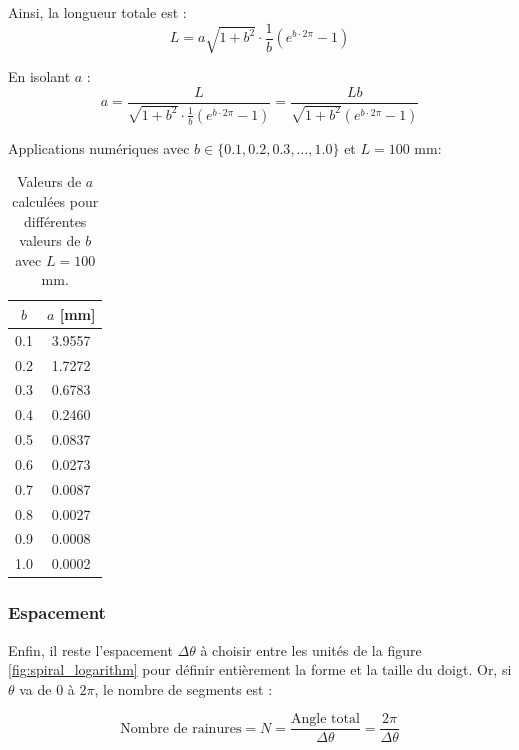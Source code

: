\documentclass[a4paper, 11pt]{report}
\begin{document}
            Ainsi, la longueur totale est :
            \[
            L = a \sqrt{1 + b^2} \cdot \frac{1}{b} \left( e^{b \cdot 2\pi} - 1 \right)
            \]
            
            En isolant \( a \) :
            \[
            a = \frac{L}{\sqrt{1 + b^2} \cdot \frac{1}{b} \left( e^{b \cdot 2\pi} - 1 \right)} = \frac{L b}{\sqrt{1 + b^2} \left( e^{b \cdot 2\pi} - 1 \right)}
            \]
            
            Applications numériques avec \( b \in \{0.1, 0.2, 0.3, \dots, 1.0\} \) et \( L = 100 \) mm:

            \begin{table}[h!]
                \centering
                \begin{tabular}{@{}c S[table-format=1.4]@{}}
                \toprule
                $b$ & {$a$ [mm]} \\
                 & 3.9557 \\
                0.2 & 1.7272 \\
                0.3 & 0.6783 \\
                0.4 & 0.2460 \\
                0.5 & 0.0837 \\
                0.6 & 0.0273 \\
                0.7 & 0.0087 \\
                0.8 & 0.0027 \\
                0.9 & 0.0008 \\
                1.0 & 0.0002 \\
                \bottomrule
                \end{tabular}
                \caption{Valeurs de $a$ calculées pour différentes valeurs de $b$ avec $L=100$ mm.}
            \end{table}

        \subsubsection{Espacement}
            
            Enfin, il reste l'espacement $\Delta\theta$ à choisir entre les unités de la figure \ref{fig:spiral_logarithm} pour définir entièrement la forme et la taille du doigt. \cite{wang_spirobs_2025} Or, si $\theta$ va de $0$ à $2\pi$, le nombre de segments est :
        
            \begin{equation}
            \text{Nombre de rainures} = N = \frac{\text{Angle total}}{\Delta\theta} = \frac{2\pi}{\Delta\theta}
            \label{eq:nb_segment}
            \end{equation}
\end{document}

